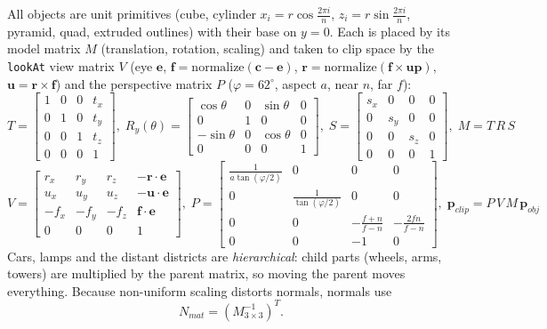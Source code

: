 \documentclass[12pt, a4paper]{report}
\begin{document}
\begin{justify}
  {\fontsize{12}{13.8}\selectfont
    All objects are unit primitives (cube, cylinder $x_i = r\cos\frac{2\pi i}{n}$, $z_i = r\sin\frac{2\pi i}{n}$, pyramid, quad, extruded outlines) with their base on $y=0$. Each is placed by its model matrix $M$ (translation, rotation, scaling) and taken to clip space by the \texttt{lookAt} view matrix $V$ (eye $\mathbf{e}$, $\mathbf{f}=\mathrm{normalize}(\mathbf{c}-\mathbf{e})$, $\mathbf{r}=\mathrm{normalize}(\mathbf{f}\times\mathbf{up})$, $\mathbf{u}=\mathbf{r}\times\mathbf{f}$) and the perspective matrix $P$ ($\varphi=62^\circ$, aspect $a$, near $n$, far $f$):
    {\footnotesize\setlength{\arraycolsep}{2.5pt}
    \begin{equation}
      T=\begin{bmatrix}1&0&0&t_x\\0&1&0&t_y\\0&0&1&t_z\\0&0&0&1\end{bmatrix},\;
      R_y(\theta)=\begin{bmatrix}\cos\theta&0&\sin\theta&0\\0&1&0&0\\-\sin\theta&0&\cos\theta&0\\0&0&0&1\end{bmatrix},\;
      S=\begin{bmatrix}s_x&0&0&0\\0&s_y&0&0\\0&0&s_z&0\\0&0&0&1\end{bmatrix},\;
      M = T\,R\,S
    \end{equation}
    \begin{equation}
      V=\begin{bmatrix}r_x&r_y&r_z&-\mathbf{r}\cdot\mathbf{e}\\u_x&u_y&u_z&-\mathbf{u}\cdot\mathbf{e}\\-f_x&-f_y&-f_z&\mathbf{f}\cdot\mathbf{e}\\0&0&0&1\end{bmatrix},\;
      P=\begin{bmatrix}\frac{1}{a\tan(\varphi/2)}&0&0&0\\0&\frac{1}{\tan(\varphi/2)}&0&0\\0&0&-\frac{f+n}{f-n}&-\frac{2fn}{f-n}\\0&0&-1&0\end{bmatrix},\;
      \mathbf{p}_{clip}=P\,V\,M\,\mathbf{p}_{obj}
    \end{equation}}
    Cars, lamps and the distant districts are \textit{hierarchical}: child parts (wheels, arms, towers) are multiplied by the parent matrix, so moving the parent moves everything. Because non-uniform scaling distorts normals, normals use
    \begin{equation}
      N_{mat} = \left(M_{3\times3}^{-1}\right)^{T}.
    \end{equation}
  }
\end{justify}
\end{document}
